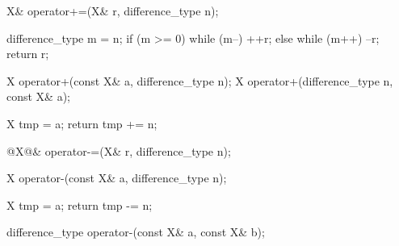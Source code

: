 \documentclass[american,twoside]{book}
\begin{document}

\color{addclr}
\begin{itemdecl}
X& operator+=(X& r, difference_type n);
\end{itemdecl}

\pnum
{}
\begin{codeblock}
{ difference_type m = n;
  if (m >= 0) while (m--) ++r;
  else while (m++) --r;
  return r; }
\end{codeblock}

\begin{itemdecl}
X operator+(const X& a, difference_type n);
X operator+(difference_type n, const X& a);
\end{itemdecl}

\pnum
{}
\begin{codeblock}
{ X tmp = a;
return tmp += n; }
\end{codeblock}

\pnum
{}

\begin{itemdecl}
@\textcolor{addclr}{X}@& operator-=(X& r, difference_type n);
\end{itemdecl}

\pnum
{}

\begin{itemdecl}
X operator-(const X& a, difference_type n);
\end{itemdecl}

\pnum
{}
\begin{codeblock}
{ X tmp = a;
  return tmp -= n; }
\end{codeblock}

\begin{itemdecl}
difference_type operator-(const X& a, const X& b);
\end{itemdecl}

\pnum
{}

\pnum
{}

\pnum
{}
\end{document}
